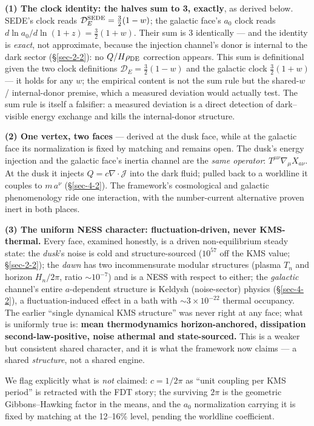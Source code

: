 \documentclass[submission, Phys]{SciPost}
\begin{document}
\textbf{(1) The clock identity: the halves sum to 3, exactly}, as
derived below. SEDE's clock reads
\(\mathcal{D}_E^{\rm SEDE} = \tfrac{3}{2}(1-w)\); the galactic face's
\(a_0\) clock reads \(d\ln a_0/d\ln(1+z) = \tfrac{3}{2}(1+w)\). Their
sum is 3 identically --- and the identity is \emph{exact}, not
approximate, because the injection channel's donor is internal to the
dark sector (§\ref{sec-2-2}): no \(Q/H\rho_{\rm DE}\) correction
appears. This sum is definitional given the two clock definitions
\(\mathcal{D}_E = \tfrac{3}{2}(1-w)\) and the galactic clock
\(\tfrac{3}{2}(1+w)\) --- it holds for any \(w\); the empirical content
is not the sum rule but the shared-\(w\) / internal-donor premise, which
a measured deviation would actually test. The sum rule is itself a
falsifier: a measured deviation is a direct detection of dark--visible
energy exchange and kills the internal-donor structure.

\textbf{(2) One vertex, two faces} --- derived at the dusk face, while
at the galactic face its normalization is fixed by matching and remains
open. The dusk's energy injection and the galactic face's inertia
channel are the \emph{same operator}: \(T^{\mu\nu}\nabla_\mu X_{a\nu}\).
At the dusk it injects \(Q = c\nabla\!\cdot\!\mathcal{J}\) into the dark
fluid; pulled back to a worldline it couples to \(m\,a^\nu\)
(§\ref{sec-4-2}). The framework's cosmological and galactic
phenomenology ride one interaction, with the number-current alternative
proven inert in both places.

\textbf{(3) The uniform NESS character: fluctuation-driven, never
KMS-thermal.} Every face, examined honestly, is a driven non-equilibrium
steady state: the \emph{dusk}'s noise is cold and structure-sourced
(\(10^{57}\) off the KMS value; §\ref{sec-2-2}); the \emph{dawn} has two
incommensurate modular structures (plasma \(T_n\) and horizon
\(H_n/2\pi\), ratio \(\sim 10^{-7}\)) and is a NESS with respect to
either; the \emph{galactic} channel's entire \(a\)-dependent structure
is Keldysh (noise-sector) physics (§\ref{sec-4-2}), a
fluctuation-induced effect in a bath with \(\sim 3\times 10^{-22}\)
thermal occupancy. The earlier ``single dynamical KMS structure'' was
never right at any face; what is uniformly true is: \textbf{mean
thermodynamics horizon-anchored, dissipation second-law-positive, noise
athermal and state-sourced.} This is a weaker but consistent shared
character, and it is what the framework now claims --- a shared
\emph{structure}, not a shared engine.

We flag explicitly what is \emph{not} claimed: \(c = 1/2\pi\) as ``unit
coupling per KMS period'' is retracted with the FDT story; the surviving
\(2\pi\) is the geometric Gibbons--Hawking factor in the means, and the
\(a_0\) normalization carrying it is fixed by matching at the 12--16\%
level, pending the worldline coefficient.
\end{document}

